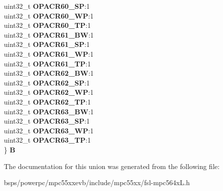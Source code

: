 \begin{DoxyCompactItemize}
\begin{tabbing}
\>uint32\_t {\bfseries OPACR60\_SP}:1\\
\>uint32\_t {\bfseries OPACR60\_WP}:1\\
\>uint32\_t {\bfseries OPACR60\_TP}:1\\
\>uint32\_t {\bfseries OPACR61\_BW}:1\\
\>uint32\_t {\bfseries OPACR61\_SP}:1\\
\>uint32\_t {\bfseries OPACR61\_WP}:1\\
\>uint32\_t {\bfseries OPACR61\_TP}:1\\
\>uint32\_t {\bfseries OPACR62\_BW}:1\\
\>uint32\_t {\bfseries OPACR62\_SP}:1\\
\>uint32\_t {\bfseries OPACR62\_WP}:1\\
\>uint32\_t {\bfseries OPACR62\_TP}:1\\
\>uint32\_t {\bfseries OPACR63\_BW}:1\\
\>uint32\_t {\bfseries OPACR63\_SP}:1\\
\>uint32\_t {\bfseries OPACR63\_WP}:1\\
\>uint32\_t {\bfseries OPACR63\_TP}:1\\
\} {\bfseries B}\\

\end{tabbing}\end{DoxyCompactItemize}


The documentation for this union was generated from the following file\+:\begin{DoxyCompactItemize}
\item 
bsps/powerpc/mpc55xxevb/include/mpc55xx/fsl-\/mpc564x\+L.\+h\end{DoxyCompactItemize}
